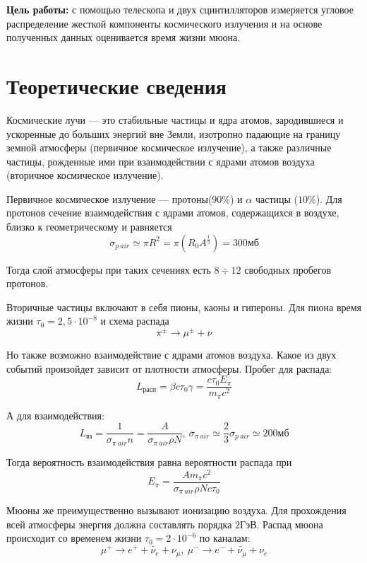 \documentclass[a4paper,12pt]{article} %
\begin{document}
\noindent
\textbf{Цель работы:} с помощью телескопа и двух сцинтилляторов измеряется угловое распределение жесткой компоненты космического излучения и на основе полученных данных оценивается время жизни мюона.

\section{Теоретические сведения}

\noindent Космические лучи --- это стабильные частицы и ядра атомов, зародившиеся и ускоренные до больших энергий вне Земли, изотропно падающие на границу земной атмосферы (первичное космическое излучение), а также различные частицы, рожденные ими при взаимодействии с ядрами атомов воздуха (вторичное космическое излучение).

\medskip
	
\noindent Первичное космическое излучение --- протоны($90\%$) и $\alpha$ частицы ($10\%$). Для протонов сечение взаимодействия с ядрами атомов, содержащихся в воздухе, близко к геометрическому и равняется 	
	$$\sigma_{p \ air} \simeq \pi R^2 = \pi (R_0 A^{\frac1{3}}) = 300\text{мб}$$
	
\noindent Тогда слой атмосферы при таких сечениях есть $8\div 12$ свободных пробегов протонов.
	
\medskip	
	
\noindent Вторичные частицы включают в себя пионы, каоны и гипероны. Для пиона время жизни $\tau_0 = 2,5\cdot 10^{-8}$ и схема распада
	$$\pi^{\pm} \rightarrow \mu^{\pm} + \nu$$
	
\noindent Но также возможно взаимодействие с ядрами атомов воздуха. Какое из двух событий произойдет зависит от плотности атмосферы. Пробег для распада:	
	$$L_{\text{расп}} = \beta c \tau_0 \gamma = \frac{c\tau_0 E_\pi}{m_\pi c^2}$$
		
		
\noindent А для взаимодействия:
	$$L_{\text{вз}} = \frac1{\sigma_{\pi\ air} n} = \frac{A} {\sigma_{\pi\ air} \rho N}, \ \sigma_{\pi\ air}\simeq \frac2{3} \sigma_{p \ air} \simeq 200 \text{мб} $$
	
\noindent Тогда вероятность взаимодействия равна вероятности распада при
	$$ E_\pi =  \frac{A m_\pi c^2} {\sigma_{\pi\ air} \rho N c \tau_0}$$
	
\noindent Мюоны же преимущественно вызывают ионизацию воздуха. Для прохождения всей атмосферы энергия должна составлять порядка $2$ГэВ. Распад мюона происходит со временем жизни $\tau_0 = 2\cdot 10^{-6}$ по каналам:
	$$\mu^{+} \rightarrow e^+ + \widetilde{\nu_e} + \nu_\mu, \ \mu^{-} \rightarrow e^- + \widetilde{\nu_\mu} + \nu_e$$
	
\end{document}
